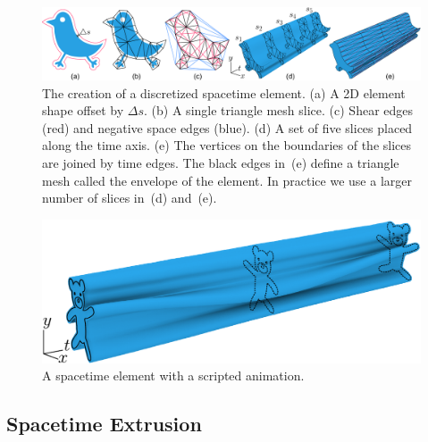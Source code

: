 \begin{figure}
\centering
\includegraphics[width=1.0\textwidth]{figures/animationpak/discretization.pdf} 
\caption[The creation of a discretized spacetime element]
{\label{fig_discretization} 
The creation of a discretized spacetime element.  
(a) A 2D element shape offset by $\Delta s$.
(b) A single triangle mesh slice.
(c) Shear edges (red) and negative space edges (blue).
(d) A set of five slices placed along the time axis.
(e) The vertices on the boundaries of the slices are joined by 
	time edges.  The black edges in~(e) define a triangle mesh
	called the envelope of the element.
	In practice we use a larger number of slices in~(d) and~(e).
}
\end{figure}

\begin{figure}
\centering
\includegraphics[width=1.0\columnwidth]{figures/animationpak/spacetime_element.pdf} 
\caption[A spacetime element with a scripted animation]
{\label{fig_spacetime_element} 
A spacetime element with a scripted animation.}
\end{figure}


\subsection{Spacetime Extrusion}
\label{animationpak_spacetime_extrusion}


